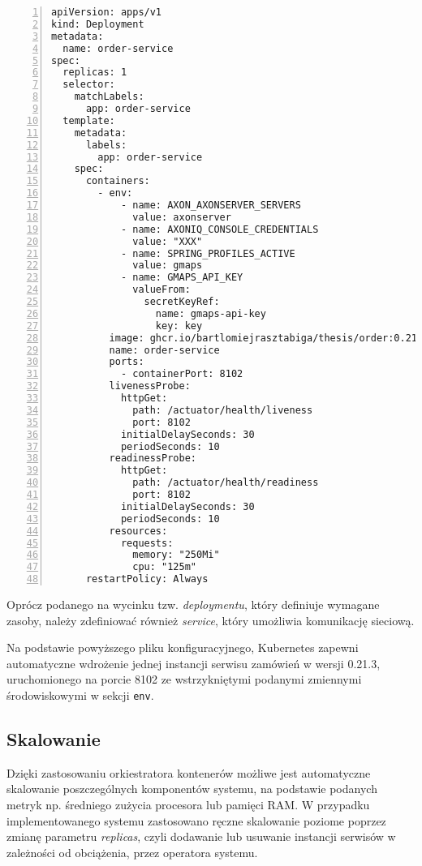 \begin{lstlisting}[caption={Fragment pliku konfiguracyjnego Kubernetes dla serwisu zamówień},label={lst:deployment-k8s},captionpos=b,numbers=left]
apiVersion: apps/v1
kind: Deployment
metadata:
  name: order-service
spec:
  replicas: 1
  selector:
    matchLabels:
      app: order-service
  template:
    metadata:
      labels:
        app: order-service
    spec:
      containers:
        - env:
            - name: AXON_AXONSERVER_SERVERS
              value: axonserver
            - name: AXONIQ_CONSOLE_CREDENTIALS
              value: "XXX"
            - name: SPRING_PROFILES_ACTIVE
              value: gmaps
            - name: GMAPS_API_KEY
              valueFrom:
                secretKeyRef:
                  name: gmaps-api-key
                  key: key
          image: ghcr.io/bartlomiejrasztabiga/thesis/order:0.21.3
          name: order-service
          ports:
            - containerPort: 8102
          livenessProbe:
            httpGet:
              path: /actuator/health/liveness
              port: 8102
            initialDelaySeconds: 30
            periodSeconds: 10
          readinessProbe:
            httpGet:
              path: /actuator/health/readiness
              port: 8102
            initialDelaySeconds: 30
            periodSeconds: 10
          resources:
            requests:
              memory: "250Mi"
              cpu: "125m"
      restartPolicy: Always
\end{lstlisting}

Oprócz podanego na wycinku tzw. \textit{deploymentu}, który definiuje wymagane zasoby, należy zdefiniować również \textit{service}, który umożliwia komunikację sieciową.

Na podstawie powyższego pliku konfiguracyjnego, Kubernetes zapewni automatyczne wdrożenie jednej instancji serwisu zamówień w wersji 0.21.3, uruchomionego na porcie 8102 ze wstrzykniętymi podanymi zmiennymi środowiskowymi w sekcji \texttt{env}.

\subsection{Skalowanie}

Dzięki zastosowaniu orkiestratora kontenerów możliwe jest automatyczne skalowanie poszczególnych komponentów systemu, na podstawie podanych metryk np. średniego zużycia procesora lub pamięci RAM. W przypadku implementowanego systemu zastosowano ręczne skalowanie poziome poprzez zmianę parametru \textit{replicas}, czyli dodawanie lub usuwanie instancji serwisów w zależności od obciążenia, przez operatora systemu.

